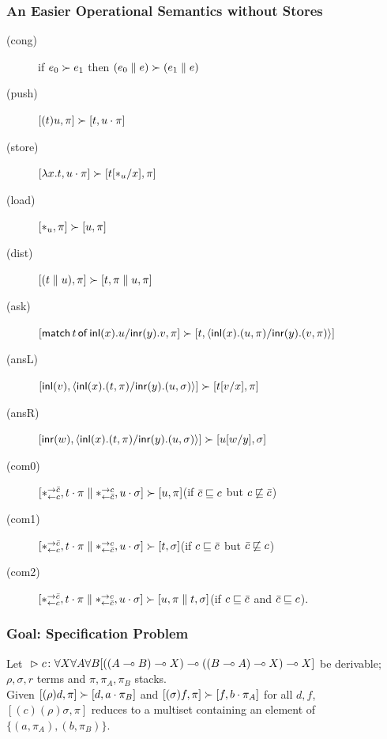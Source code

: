 \documentclass[slidestop,compress,mathserif]{beamer}
\begin{document}
  \begin{frame}
   \frametitle{An Easier Operational Semantics without Stores}
   \begin{description}
    \item[(cong)] if
	 $e_0         \succ e_1$
	 then
	 $(e_0 \parallel e) \succ (e_1\parallel e)$
    \item[(push)]
	 $[(t)u,\pi]      \succ [t,u\cdot\pi]$
    \item[(store)]
	 $[\lambda x.t,u\cdot\pi]
	 \succ
	 [t[\ast_u/x],      \pi]$
    \item[(load)]
	 $[\ast_u,\pi]\succ [u,\pi]$
    \item[(dist)]
	 $[(t\parallel u),\pi]  \succ [t,\pi\parallel u,\pi]$
    \item[(ask)]
	 $[\mathsf{match}\,{t}\,\mathsf{of}\, \mathsf{inl}({x}). {u}/ \mathsf{inr}({y}). {v},\pi]\succ [t,\langle \mathsf{inl}({x}). ({u},{\pi})/ \mathsf{inr}({y}). ({v},{\pi})\rangle]$
    \item[(ansL)]
	 $[\mathsf{inl}({v}), \langle \mathsf{inl}({x}). ({t},{\pi})/ \mathsf{inr}({y}). ({u},{\sigma})\rangle] \succ [t[v/x],\pi] $
    \item[(ansR)]
	 $[\mathsf{inr}({w}), \langle \mathsf{inl}({x}). ({t},{\pi})/ \mathsf{inr}({y}). ({u},{\sigma})\rangle] \succ [u[w/y],\sigma] $
    \item[(com0)]
	 $[\ast^{\rightarrow {\bar{c}}}_{\leftarrow{c}}, t\cdot\pi\parallel \ast^{\rightarrow {c}}_{\leftarrow{\bar{c}}},
	 u\cdot\sigma] \succ
	 [u,\pi]$\enspace(if $\bar{c}\sqsubseteq c$ but $c\not\sqsubseteq \bar{c}$)
    \item[(com1)]
	 $[\ast^{\rightarrow {\bar{c}}}_{\leftarrow{c}}, t\cdot\pi\parallel \ast^{\rightarrow {c}}_{\leftarrow{\bar{c}}},
	 u\cdot\sigma] \succ
	 [t,\sigma]$\enspace(if $c\sqsubseteq \bar{c}$ but $\bar{c}\not\sqsubseteq c$)
    \item[(com2)]
	 $[\ast^{\rightarrow {\bar{c}}}_{\leftarrow{c}}, t\cdot\pi\parallel \ast^{\rightarrow {c}}_{\leftarrow{\bar{c}}},
	 u\cdot\sigma] \succ
	 [u,\pi\parallel t,\sigma]$\enspace(if $c\sqsubseteq \bar{c}$ and $\bar{c}\sqsubseteq
	 c$)\enspace.
   \end{description}
  \end{frame}

  \begin{frame}
   \frametitle{Goal: Specification Problem}
   \begin{proposition}
    \label{prop:spec}
    Let
    ${}\vartriangleright{}{ {c} \colon{\forall X\forall A\forall B
    [((A\multimap B)\multimap X)
    \multimap((B\multimap A)\multimap X)
    \multimap X]} }$
    be
    derivable;
    $\rho,\sigma, r$ terms and $\pi, \pi_A,
    \pi_B$ stacks. \\
    Given $[(\rho)d  ,\pi]\succ [d,a\cdot \pi_B]$ and
    $[(\sigma)f,\pi]\succ [f,b\cdot \pi_A]$ for all $d, f$,\\
    $[(c)(\rho)\sigma,\pi]$ reduces to a multiset containing an
    element of
    $\{(a,\pi_A),(b,\pi_B)\}$.
   \end{proposition}
  \end{frame}
\end{document}
